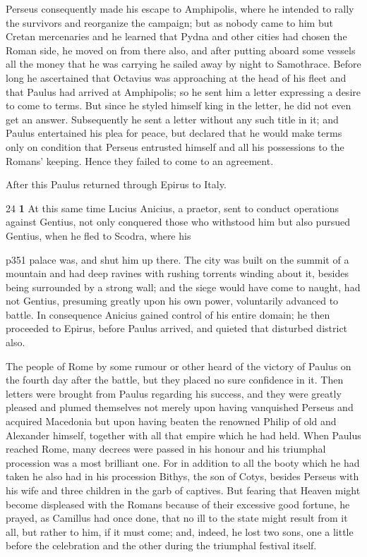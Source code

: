 Perseus consequently made his escape to Amphipolis, where he intended to rally the survivors and reorganize the campaign; but as nobody came to him but Cretan mercenaries and he learned that Pydna and other cities had chosen the Roman side, he moved on from there also, and after putting aboard some vessels all the money that he was carrying he sailed away by night to Samothrace. Before long he ascertained that Octavius was approaching at the head of his fleet and that Paulus had arrived at Amphipolis; so he sent him a letter expressing a desire to come to terms. But since he styled himself king in the letter, he did not even get an answer. Subsequently he sent a letter without any such title in it; and Paulus entertained his plea for peace, but declared that he would make terms only on condition that Perseus entrusted himself and all his possessions to the Romans' keeping. Hence they failed to come to an agreement.

After this Paulus returned through Epirus to Italy.

24
\textbf{1} At this same time Lucius Anicius, a praetor, sent to conduct operations against Gentius, not only conquered those who withstood him but also pursued Gentius, when he fled to Scodra, where his

p351 palace was, and shut him up there. The city was built on the summit of a mountain and had deep ravines with rushing torrents winding about it, besides being surrounded by a strong wall; and the siege would have come to naught, had not Gentius, presuming greatly upon his own power, voluntarily advanced to battle. In consequence Anicius gained control of his entire domain; he then proceeded to Epirus, before Paulus arrived, and quieted that disturbed district also.

The people of Rome by some rumour or other heard of the victory of Paulus on the fourth day after the battle, but they placed no sure confidence in it. Then letters were brought from Paulus regarding his success, and they were greatly pleased and plumed themselves not merely upon having vanquished Perseus and acquired Macedonia but upon having beaten the renowned Philip of old and Alexander himself, together with all that empire which he had held. When Paulus reached Rome, many decrees were passed in his honour and his triumphal procession was a most brilliant one. For in addition to all the booty which he had taken he also had in his procession Bithys, the son of Cotys, besides Perseus with his wife and three children in the garb of captives. But fearing that Heaven might become displeased with the Romans because of their excessive good fortune, he prayed, as Camillus had once done, that no ill to the state might result from it all, but rather to him, if it must come; and, indeed, he lost two sons, one a little before the celebration and the other during the triumphal festival itself.

